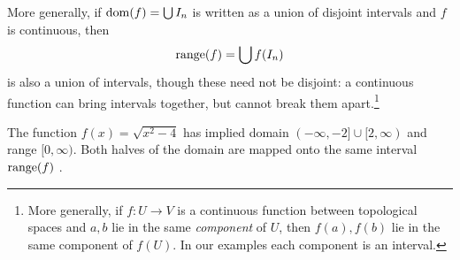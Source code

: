 More generally, if $\operatorname{dom}(f)=\bigcup I_n$ is written as a union of disjoint intervals and $f$ is continuous, then
\[
	\operatorname{range}(f)=\bigcup f(I_n)
\]
is also a union of intervals, though these need not be disjoint: a continuous function can bring intervals together, but cannot break them apart.\footnote{%
	More generally, if $f:U\to V$ is a continuous function between topological spaces and $a,b$ lie in the same \emph{component} of $U$, then $f(a),f(b)$ lie in the same component of $f(U)$. In our examples each component is an interval.}

\begin{example}{}{}
	The function $f(x)=\sqrt{x^2-4}$ has implied domain $(-\infty,-2]\cup[2,\infty)$ and range $[0,\infty)$. Both halves of the domain are mapped onto the same interval $\operatorname{range}(f)$ .
\end{example}

\goodbreak



